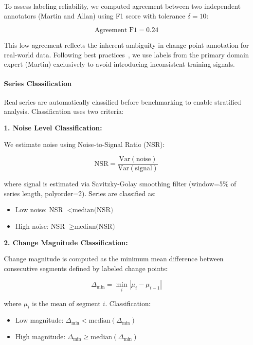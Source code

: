 To assess labeling reliability, we computed agreement between two independent annotators (Martin and Allan) using F1 score with tolerance $\delta=10$:

\begin{equation}
\text{Agreement F1} = 0.24
\end{equation}

This low agreement reflects the inherent ambiguity in change point annotation for real-world data. Following best practices~\cite{artstein2008inter}, we use labels from the primary domain expert (Martin) exclusively to avoid introducing inconsistent training signals.

\paragraph{Series Classification}

Real series are automatically classified before benchmarking to enable stratified analysis. Classification uses two criteria:

\textbf{1. Noise Level Classification:}

We estimate noise using Noise-to-Signal Ratio (NSR):

\begin{equation}
\text{NSR} = \frac{\text{Var}(\text{noise})}{\text{Var}(\text{signal})}
\end{equation}

where signal is estimated via Savitzky-Golay smoothing filter (window=5\% of series length, polyorder=2). Series are classified as:
\begin{itemize}
    \item Low noise: NSR $< \text{median(NSR)}$
    \item High noise: NSR $\geq \text{median(NSR)}$
\end{itemize}

\textbf{2. Change Magnitude Classification:}

Change magnitude is computed as the minimum mean difference between consecutive segments defined by labeled change points:

\begin{equation}
\Delta_{\text{min}} = \min_{i} |\mu_i - \mu_{i-1}|
\end{equation}

where $\mu_i$ is the mean of segment $i$. Classification:
\begin{itemize}
    \item Low magnitude: $\Delta_{\text{min}} < \text{median}(\Delta_{\text{min}})$
    \item High magnitude: $\Delta_{\text{min}} \geq \text{median}(\Delta_{\text{min}})$
\end{itemize}

